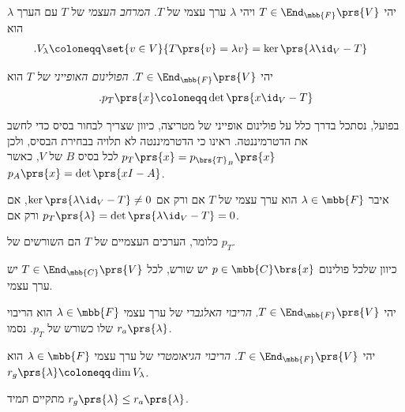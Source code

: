 \documentclass[a4paper,10pt,twoside,openany]{book}
\begin{document}
\begin{definition}
יהי
$T \in \End_{\mbb{F}}\prs{V}$
ויהי
$\lambda$
ערך עצמי של
$T$.
\emph{המרחב העצמי}
של
$T$
עם הערך
$\lambda$
הוא
\begin{align*}
\text{.} V_{\lambda} &\coloneqq \set{v \in V}{T\prs{v} = \lambda v} = \ker\prs{\lambda \id_V - T}
\end{align*}
\end{definition}

\begin{definition}
יהי
$T \in \End_{\mbb{F}}\prs{V}$.
\emph{הפולינום האופייני של
$T$}
הוא
\[\text{.} p_T\prs{x} \coloneqq \det\prs{x \id_V - T}\]
\end{definition}

\begin{remark}
בפועל, נסתכל בדרך כלל על פולינום אופייני של מטריצה, כיוון שצריך לבחור בסיס כדי לחשב את הדטרמיננטה.
ראינו כי הדטרמיננטה לא תלויה בבחירת הבסיס, ולכן
$p_T\prs{x} = p_{\brs{T}_B}\prs{x}$
לכל בסיס
$B$
של
$V$,
כאשר
$p_A\prs{x} = \det\prs{xI - A}$.
\end{remark}

\begin{corollary}
איבר
$\lambda \in \mbb{F}$
הוא ערך עצמי של
$T$
אם ורק אם
$\ker\prs{\lambda \id_V - T} \neq 0$,
אם ורק אם
$p_T\prs{\lambda} = \det\prs{\lambda \id_V - T} = 0$.

כלומר, הערכים העצמיים של
$T$
הם השורשים של
$p_T$.
\end{corollary}

\begin{remark}
כיוון שלכל פולינום
$p \in \mbb{C}\brs{x}$
יש שורש, לכל
$T \in \End_{\mbb{C}}\prs{V}$
יש ערך עצמי.
\end{remark}

\begin{definition}
יהי
$T \in \End_{\mbb{F}}\prs{V}$.
\emph{הריבוי האלגברי}
של ערך עצמי
$\lambda \in \mbb{F}$
הוא הריבוי שלו כשורש של
$p_T$.
נסמו
$r_a\prs{\lambda}$.
\end{definition}

\begin{definition}
יהי
$T \in \End_{\mbb{F}}\prs{V}$.
\emph{הריבוי הגיאומטרי}
של ערך עצמי
$\lambda \in \mbb{F}$
הוא
$r_g\prs{\lambda} \coloneqq \dim V_\lambda$.
\end{definition}

\begin{remark}
מתקיים תמיד
$r_g\prs{\lambda} \leq r_a\prs{\lambda}$.
\end{remark}
\end{document}
